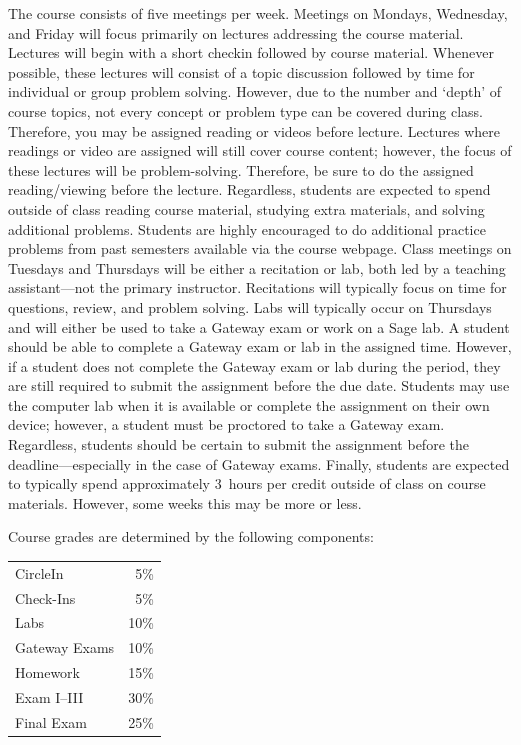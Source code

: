 \documentclass[11pt,letterpaper]{article}
\begin{document}
The course consists of five meetings per week. Meetings on Mondays, Wednesday, and Friday will focus primarily on lectures addressing the course material. Lectures will begin with a short checkin followed by course material. Whenever possible, these lectures will consist of a topic discussion followed by time for individual or group problem solving. However, due to the number and `depth' of course topics, not every concept or problem type can be covered during class. Therefore, you may be assigned reading or videos before lecture. Lectures where readings or video are assigned will still cover course content; however, the focus of these lectures will be problem-solving. Therefore, be sure to do the assigned reading/viewing before the lecture. Regardless, students are expected to spend outside of class reading course material, studying extra materials, and solving additional problems. Students are highly encouraged to do additional practice problems from past semesters available via the course webpage. Class meetings on Tuesdays and Thursdays will be either a recitation or lab, both led by a teaching assistant---not the primary instructor. Recitations will typically focus on time for questions, review, and problem solving. Labs will typically occur on Thursdays and will either be used to take a Gateway exam or work on a Sage lab. A student should be able to complete a Gateway exam or lab in the assigned time. However, if a student does not complete the Gateway exam or lab during the period, they are still required to submit the assignment before the due date. Students may use the computer lab when it is available or complete the assignment on their own device; however, a student must be proctored to take a Gateway exam. Regardless, students should be certain to submit the assignment before the deadline---especially in the case of Gateway exams. Finally, students are expected to typically spend approximately 3~hours per credit outside of class on course materials. However, some weeks this may be more or less. 
\sectionbreak






Course grades are determined by the following components: \par
	\begin{table}[!ht]
        \begin{tabular}{lr}
	CircleIn & 5\% \\
	Check-Ins & 5\% \\
	Labs & 10\% \\
	Gateway Exams & 10\% \\
	Homework & 15\% \\
	Exam I--III & 30\% \\
	Final Exam & 25\%
        \end{tabular} 
        \end{table}
\sectionbreak
\end{document}
